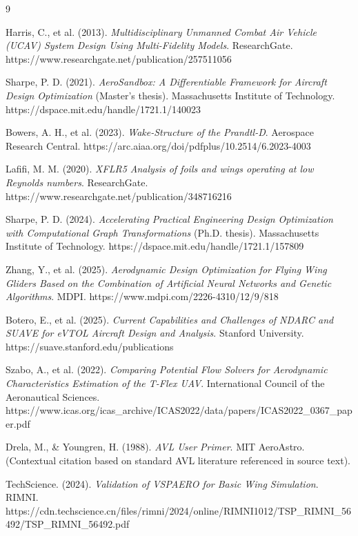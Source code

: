 \documentclass[12pt]{article}
\begin{document}
\begin{thebibliography}{9}

Harris, C., et al. (2013). \textit{Multidisciplinary Unmanned Combat Air Vehicle (UCAV) System Design Using Multi-Fidelity Models}. ResearchGate. https://www.researchgate.net/publication/257511056

Sharpe, P. D. (2021). \textit{AeroSandbox: A Differentiable Framework for Aircraft Design Optimization} (Master's thesis). Massachusetts Institute of Technology. https://dspace.mit.edu/handle/1721.1/140023

Bowers, A. H., et al. (2023). \textit{Wake-Structure of the Prandtl-D}. Aerospace Research Central. https://arc.aiaa.org/doi/pdfplus/10.2514/6.2023-4003

Lafifi, M. M. (2020). \textit{XFLR5 Analysis of foils and wings operating at low Reynolds numbers}. ResearchGate. https://www.researchgate.net/publication/348716216

Sharpe, P. D. (2024). \textit{Accelerating Practical Engineering Design Optimization with Computational Graph Transformations} (Ph.D. thesis). Massachusetts Institute of Technology. https://dspace.mit.edu/handle/1721.1/157809

Zhang, Y., et al. (2025). \textit{Aerodynamic Design Optimization for Flying Wing Gliders Based on the Combination of Artificial Neural Networks and Genetic Algorithms}. MDPI. https://www.mdpi.com/2226-4310/12/9/818

Botero, E., et al. (2025). \textit{Current Capabilities and Challenges of NDARC and SUAVE for eVTOL Aircraft Design and Analysis}. Stanford University. https://suave.stanford.edu/publications

Szabo, A., et al. (2022). \textit{Comparing Potential Flow Solvers for Aerodynamic Characteristics Estimation of the T-Flex UAV}. International Council of the Aeronautical Sciences. https://www.icas.org/icas\_archive/ICAS2022/data/papers/ICAS2022\_0367\_paper.pdf

Drela, M., \& Youngren, H. (1988). \textit{AVL User Primer}. MIT AeroAstro. (Contextual citation based on standard AVL literature referenced in source text).

TechScience. (2024). \textit{Validation of VSPAERO for Basic Wing Simulation}. RIMNI. https://cdn.techscience.cn/files/rimni/2024/online/RIMNI1012/TSP\_RIMNI\_56492/TSP\_RIMNI\_56492.pdf

\end{thebibliography}
\end{document}
